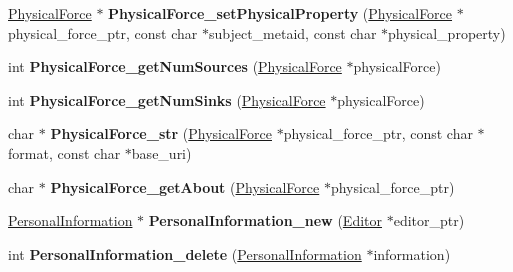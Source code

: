 \begin{DoxyCompactItemize}
\item 
\mbox{\label{namespaceomexmeta_a3942ac5b5d7393eea5f0644c2f31cbc5}} 
\hyperlink{classomexmeta_1_1PhysicalForce}{Physical\+Force} $\ast$ {\bfseries Physical\+Force\+\_\+set\+Physical\+Property} (\hyperlink{classomexmeta_1_1PhysicalForce}{Physical\+Force} $\ast$physical\+\_\+force\+\_\+ptr, const char $\ast$subject\+\_\+metaid, const char $\ast$physical\+\_\+property)
\item 
\mbox{\label{namespaceomexmeta_aae66100eb98adbc738a6476dcb018e8f}} 
int {\bfseries Physical\+Force\+\_\+get\+Num\+Sources} (\hyperlink{classomexmeta_1_1PhysicalForce}{Physical\+Force} $\ast$physical\+Force)
\item 
\mbox{\label{namespaceomexmeta_a1bec2b6579c0eba8a719f68d39b09c2e}} 
int {\bfseries Physical\+Force\+\_\+get\+Num\+Sinks} (\hyperlink{classomexmeta_1_1PhysicalForce}{Physical\+Force} $\ast$physical\+Force)
\item 
\mbox{\label{namespaceomexmeta_a8a3f3cf23e3c5253f0a92f6374a2059b}} 
char $\ast$ {\bfseries Physical\+Force\+\_\+str} (\hyperlink{classomexmeta_1_1PhysicalForce}{Physical\+Force} $\ast$physical\+\_\+force\+\_\+ptr, const char $\ast$format, const char $\ast$base\+\_\+uri)
\item 
\mbox{\label{namespaceomexmeta_a4428467ced5ab11c48a3b16284048a36}} 
char $\ast$ {\bfseries Physical\+Force\+\_\+get\+About} (\hyperlink{classomexmeta_1_1PhysicalForce}{Physical\+Force} $\ast$physical\+\_\+force\+\_\+ptr)
\item 
\mbox{\label{namespaceomexmeta_a119fbc0317a5af631e7f68caece8c70b}} 
\hyperlink{classomexmeta_1_1PersonalInformation}{Personal\+Information} $\ast$ {\bfseries Personal\+Information\+\_\+new} (\hyperlink{classomexmeta_1_1Editor}{Editor} $\ast$editor\+\_\+ptr)
\item 
\mbox{\label{namespaceomexmeta_a5dcd490456bde3f95069f91e65c2b042}} 
int {\bfseries Personal\+Information\+\_\+delete} (\hyperlink{classomexmeta_1_1PersonalInformation}{Personal\+Information} $\ast$information)
\item 
\mbox{\label{namespaceomexmeta_a9db9c9c591926b3e9061b2ca7cb4541f}} 

\end{DoxyCompactItemize}
